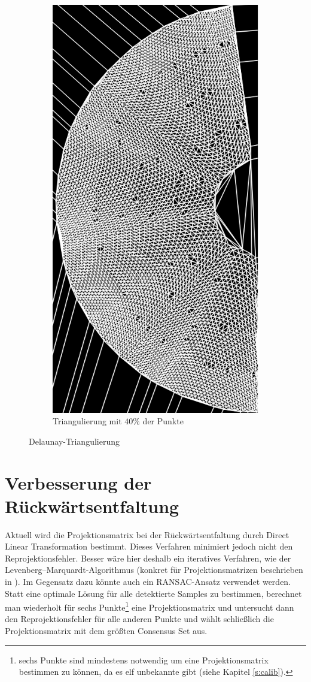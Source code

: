 \begin{figure}[!htb]
\begin{subfigure}{.9\textwidth}
		\includegraphics[angle=-90, width=.8\textwidth]{images/delaunay2.png}
		\caption{Triangulierung mit $40\%$ der Punkte}
	\end{subfigure}
	\caption{Delaunay-Triangulierung}
	\label{fig:delaunayTriag}
\end{figure}


\section{Verbesserung der Rückwärtsentfaltung}
Aktuell wird die Projektionsmatrix bei der Rückwärtsentfaltung durch Direct Linear Transformation bestimmt. Dieses Verfahren minimiert jedoch nicht den Reprojektionsfehler. Besser wäre hier deshalb ein iteratives Verfahren, wie der Levenberg–Marquardt-Algorithmus (konkret für Projektionsmatrizen beschrieben in \cite{Hartley2000}).
Im Gegensatz dazu könnte auch ein RANSAC-Ansatz verwendet werden. Statt eine optimale Lösung für alle detektierte Samples zu bestimmen, berechnet man wiederholt für sechs Punkte\footnote{sechs Punkte sind mindestens notwendig um eine Projektionsmatrix bestimmen zu können, da es elf unbekannte gibt (siehe Kapitel \ref{s:calib}).} eine Projektionsmatrix und untersucht dann den Reprojektionsfehler für alle anderen Punkte und wählt schließlich die Projektionsmatrix mit dem größten Consensus Set aus.


